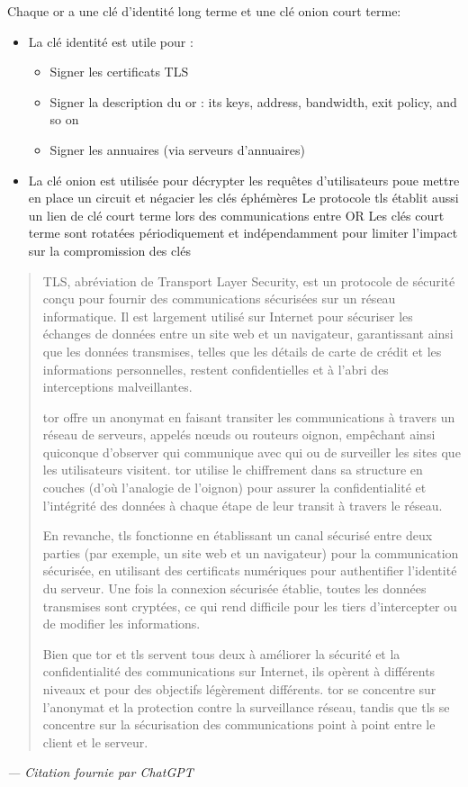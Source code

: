 \documentclass[12pt]{article}
\begin{document}
Chaque \acrshort{or} a une clé d'identité long terme et une clé onion court terme:
\begin{itemize}
    \item La clé identité est utile pour :
    \begin{itemize}
        \item Signer les certificats TLS
        \item Signer la description du \acrshort{or} : its keys, address, bandwidth, exit policy, and so on
        \item Signer les annuaires (via serveurs d'annuaires)
    \end{itemize}
    
    \item La clé onion est utilisée pour décrypter les requêtes d'utilisateurs poue mettre en place un circuit et négacier les clés éphémères
    Le protocole \acrshort{tls} établit aussi un lien de clé court terme lors des communications entre OR
    Les clés court terme sont rotatées périodiquement et indépendamment pour limiter l'impact sur la compromission des clés
\end{itemize}

\begin{quote}
    TLS, abréviation de Transport Layer Security, est un protocole de sécurité conçu pour fournir des communications sécurisées sur un réseau informatique. Il est largement utilisé sur Internet pour sécuriser les échanges de données entre un site web et un navigateur, garantissant ainsi que les données transmises, telles que les détails de carte de crédit et les informations personnelles, restent confidentielles et à l'abri des interceptions malveillantes.
    
    \acrshort{tor} offre un anonymat en faisant transiter les communications à travers un réseau de serveurs, appelés nœuds ou routeurs oignon, empêchant ainsi quiconque d'observer qui communique avec qui ou de surveiller les sites que les utilisateurs visitent. \acrshort{tor} utilise le chiffrement dans sa structure en couches (d'où l'analogie de l'oignon) pour assurer la confidentialité et l'intégrité des données à chaque étape de leur transit à travers le réseau.
    
    En revanche, \acrshort{tls} fonctionne en établissant un canal sécurisé entre deux parties (par exemple, un site web et un navigateur) pour la communication sécurisée, en utilisant des certificats numériques pour authentifier l'identité du serveur. Une fois la connexion sécurisée établie, toutes les données transmises sont cryptées, ce qui rend difficile pour les tiers d'intercepter ou de modifier les informations.
    
    Bien que \acrshort{tor} et \acrshort{tls} servent tous deux à améliorer la sécurité et la confidentialité des communications sur Internet, ils opèrent à différents niveaux et pour des objectifs légèrement différents. \acrshort{tor} se concentre sur l'anonymat et la protection contre la surveillance réseau, tandis que \acrshort{tls} se concentre sur la sécurisation des communications point à point entre le client et le serveur.
\end{quote}
\textit{— Citation fournie par ChatGPT}
\end{document}
